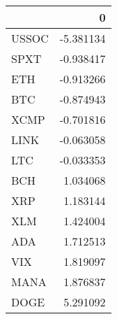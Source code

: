 \begin{tabular}{lr}
\toprule
 & 0 \\
\midrule
USSOC & -5.381134 \\
SPXT & -0.938417 \\
ETH & -0.913266 \\
BTC & -0.874943 \\
XCMP & -0.701816 \\
LINK & -0.063058 \\
LTC & -0.033353 \\
BCH & 1.034068 \\
XRP & 1.183144 \\
XLM & 1.424004 \\
ADA & 1.712513 \\
VIX & 1.819097 \\
MANA & 1.876837 \\
DOGE & 5.291092 \\
\bottomrule
\end{tabular}
